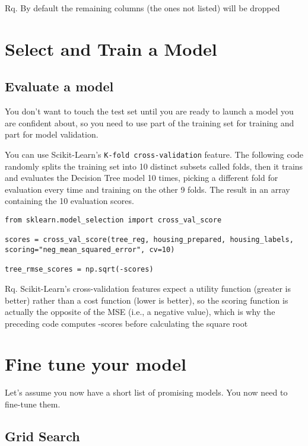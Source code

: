 \documentclass[french]{article}
\begin{document}
Rq. By default the remaining columns (the ones not listed) will be dropped

\section{Select and Train a Model}

\subsection{Evaluate a model}

You don't want to touch the test set until you are ready to launch a model you are confident about, so you need to use part of the training set for training and part for model validation.

You can use Scikit-Learn's \lstinline{K-fold cross-validation} feature. The following code randomly splits the training set into 10 distinct subsets called folds, then it trains and evaluates the Decision Tree model 10 times, picking a different fold for evaluation every time and training on the other 9 folds. The result in an array containing the 10 evaluation scores.

\begin{lstlisting}
from sklearn.model_selection import cross_val_score

scores = cross_val_score(tree_reg, housing_prepared, housing_labels, scoring="neg_mean_squared_error", cv=10)

tree_rmse_scores = np.sqrt(-scores)
\end{lstlisting}

Rq. Scikit-Learn’s cross-validation features expect a utility function (greater is better) rather than a cost function (lower is better), so the scoring function is actually the opposite of the MSE (i.e., a negative value), which is why the preceding code computes -scores before calculating the square root 

\section{Fine tune your model}

Let's assume you now have a short list of promising models. You now need to fine-tune them.

\subsection{Grid Search}
\end{document}

